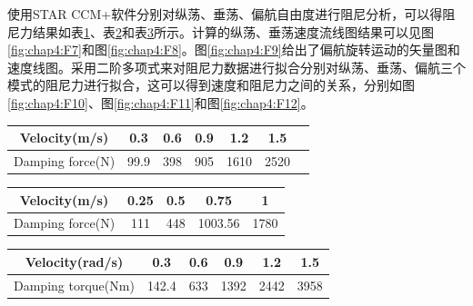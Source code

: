 使用STAR CCM+软件分别对纵荡、垂荡、偏航自由度进行阻尼分析，可以得阻尼力结果如表\ref{tab:chap4:table3-2}、表\ref{tab:chap4:table3-3}和表\ref{tab:chap4:table3-4}所示。计算的纵荡、垂荡速度流线图结果可以见图\ref{fig:chap4:F7}和图\ref{fig:chap4:F8}。图\ref{fig:chap4:F9}给出了偏航旋转运动的矢量图和速度线图。采用二阶多项式来对阻尼力数据进行拟合分别对纵荡、垂荡、偏航三个模式的阻尼力进行拟合，这可以得到速度和阻尼力之间的关系，分别如图\ref{fig:chap4:F10}、图\ref{fig:chap4:F11}和图\ref{fig:chap4:F12}。


\begin{table}
\centering
\label{tab:chap4:table3-2}
\begin{tabular}{ccccccc}
\toprule
 Velocity(m/s)    & 0.3 & 0.6 & 0.9 &1.2  &1.5   \\
\midrule
 Damping force(N) & 99.9 &398 &905 & 1610 & 2520  \\
\bottomrule
\end{tabular}
\end{table}

\begin{table}
\centering
\label{tab:chap4:table3-3}
\begin{tabular}{ccccc}
\toprule
 Velocity(m/s)    & 0.25   & 0.5 & 0.75    &1     \\
\midrule
 Damping force(N) & 111    & 448 & 1003.56 & 1780 \\
\bottomrule
\end{tabular}
\end{table}

\begin{table}
\centering
\label{tab:chap4:table3-4}
\begin{tabular}{cccccc}
\toprule
 Velocity(rad/s)    & 0.3   & 0.6 & 0.9  &1.2   & 1.5   \\
\midrule
 Damping torque(Nm) & 142.4 & 633 & 1392 & 2442 &3958    \\
\bottomrule
\end{tabular}
\end{table}

